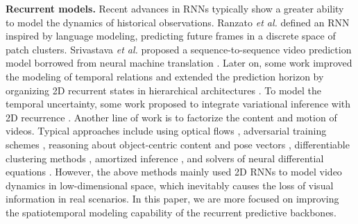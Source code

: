 \documentclass[10pt,journal,compsoc]{IEEEtran}
\newcommand{\myparagraph}[1]{\vspace{5pt} \noindent \textbf{#1.}}
\begin{document}
\myparagraph{Recurrent models}
Recent advances in RNNs typically show a greater ability to model the dynamics of historical observations.
Ranzato \textit{et al.} \cite{Ranzato2014Video} defined an RNN inspired by language modeling, predicting future frames in a discrete space of patch clusters. 
Srivastava \textit{et al.} \cite{srivastava2015unsupervised} proposed a sequence-to-sequence video prediction model borrowed from neural machine translation \cite{Sutskever2011Generating}.
Later on, some work improved the modeling of temporal relations and extended the prediction horizon by organizing 2D recurrent states in hierarchical architectures \cite{villegas2017learning,wichers2018hierarchical,kim2019variational}.
To model the temporal uncertainty, some work proposed to integrate variational inference with 2D recurrence
\cite{babaeizadeh2017stochastic,denton2018stochastic,lee2018stochastic,villegas2019high,castrejon2019improved,franceschi2020stochastic,wu2021greedy}. 
Another line of work is to factorize the content and motion of videos. 
Typical approaches include using optical flows \cite{Villegas2017Decomposing,bei2021learning}, adversarial training schemes \cite{denton2017unsupervised}, reasoning about object-centric content and pose vectors \cite{hsieh2018learning,bodla2021hierarchical}, differentiable clustering methods \cite{van2018relational}, amortized inference \cite{zablotskaia2020unsupervised,greff2019multi}, and solvers of neural differential equations \cite{guen2020disentangling}.
However, the above methods 
mainly used 2D RNNs to model video dynamics in low-dimensional space, which inevitably causes the loss of visual information in real scenarios. In this paper, we are more focused on improving the spatiotemporal modeling capability of the recurrent predictive backbones. 
\end{document}
